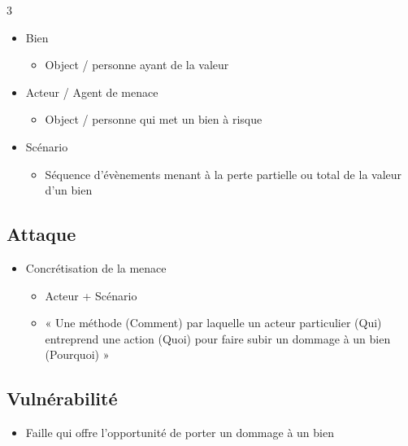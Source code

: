 \documentclass[9pt, a4paper, twoside]{article}
\begin{document}
\begin{multicols}{3}
\begin{itemize}[leftmargin=0.5em,label=$\bullet$]
    \item \scriptsize Bien
    \begin{itemize}[leftmargin=0.5em,label=$\circ$]
        \item \scriptsize Object / personne ayant de la valeur
    \end{itemize}
    \item \scriptsize Acteur / Agent de menace
    \begin{itemize}[leftmargin=0.5em,label=$\circ$]
        \item \scriptsize Object / personne qui met un bien à risque
    \end{itemize}
    \item \scriptsize Scénario
    \begin{itemize}[leftmargin=0.5em,label=$\circ$]
        \item \scriptsize Séquence d'évènements menant à la perte partielle ou total de la valeur d'un bien
    \end{itemize}
\end{itemize}

\footnotesize \subsection{Attaque}

\begin{itemize}[leftmargin=0.5em,label=$\bullet$]
    \item \scriptsize Concrétisation de la menace
    \begin{itemize}[leftmargin=0.5em,label=$\circ$]
        \item \scriptsize Acteur + Scénario
        \item \scriptsize « Une méthode (Comment) par laquelle un acteur particulier (Qui) entreprend une action (Quoi) pour faire subir un dommage à un bien (Pourquoi) »
    \end{itemize}
\end{itemize}

\footnotesize \subsection{Vulnérabilité}

\begin{itemize}[leftmargin=0.5em,label=$\bullet$]
    \item \scriptsize Faille qui offre l'opportunité de porter un dommage à un bien
\end{itemize}


\end{multicols}
\end{document}
